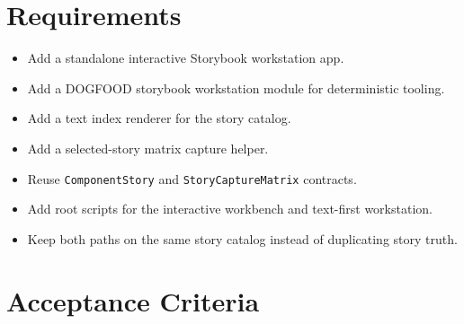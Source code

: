 \section{Requirements}\label{record-088-requirements}

\begin{itemize}
\tightlist
\item
  Add a standalone interactive Storybook workstation app.
\item
  Add a DOGFOOD storybook workstation module for deterministic tooling.
\item
  Add a text index renderer for the story catalog.
\item
  Add a selected-story matrix capture helper.
\item
  Reuse \texttt{C\allowbreak{}o\allowbreak{}m\allowbreak{}p\allowbreak{}o\allowbreak{}n\allowbreak{}e\allowbreak{}n\allowbreak{}t\allowbreak{}S\allowbreak{}t\allowbreak{}o\allowbreak{}r\allowbreak{}y} and \texttt{S\allowbreak{}t\allowbreak{}o\allowbreak{}r\allowbreak{}y\allowbreak{}C\allowbreak{}a\allowbreak{}p\allowbreak{}t\allowbreak{}u\allowbreak{}r\allowbreak{}e\allowbreak{}M\allowbreak{}a\allowbreak{}t\allowbreak{}r\allowbreak{}i\allowbreak{}x} contracts.
\item
  Add root scripts for the interactive workbench and text-first workstation.
\item
  Keep both paths on the same story catalog instead of duplicating story truth.
\end{itemize}

\section{Acceptance Criteria}\label{record-088-acceptance-criteria}


